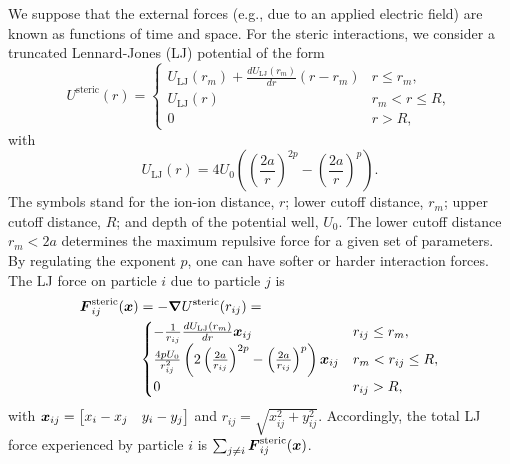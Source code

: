 \documentclass[letterpaper, 11pt]{article}
\begin{document}
We suppose that the external forces (e.g., due to an applied electric field) are known as functions of time and space. For the steric interactions, we consider a truncated Lennard-Jones (LJ) potential of the form
\begin{equation}
  U^{\text{steric}}(r)=
  \begin{cases}
    U_{\text{LJ}}(r_m)+\frac{dU_{\mathrm{LJ}}(r_m)}{dr}(r-r_m) & r\leq r_m,\\
    U_{\text{LJ}}(r) & r_m<r\leq R,\\
    0 & r>R,
  \end{cases}
  \label{Eq:LJPot}
\end{equation}
with
\begin{equation}
  U_{\text{LJ}}(r)=4U_0\left(\left(\frac{2a}{r}\right)^{2p}-\left(\frac{2a}{r}\right)^p\right).
  \label{Eq:LJPot}
\end{equation}
The symbols stand for the ion-ion distance, $r$; lower cutoff distance, $r_m$; upper cutoff distance, $R$; and depth of the potential well, $U_0$. The lower cutoff distance $r_m<2a$ determines the maximum repulsive force for a given set of parameters. By regulating the exponent $p$, one can have softer or harder interaction forces. The LJ force on particle $i$ due to particle $j$ is
\begin{align}
  \boldsymbol{F}^{\text{steric}}_{ij}(\boldsymbol{x})&=-\boldsymbol{\nabla} U^{\text{steric}}(r_{ij})=\nonumber\\
  &\begin{cases}
    -\frac{1}{r_{ij}}\frac{dU_{\mathrm{LJ}}(r_m)}{dr}\boldsymbol{x}_{ij} & r_{ij}\leq r_m,\\
    \frac{4pU_0}{r_{ij}^2}\left(2\left(\frac{2a}{r_{ij}}\right)^{2p}-\left(\frac{2a}{r_{ij}}\right)^p\right)\boldsymbol{x}_{ij} & r_m<r_{ij}\leq R,\\
    0 & r_{ij}>R,
  \end{cases}
  \label{Eq:LJForce}
\end{align}
with $\boldsymbol{x}_{ij}=\begin{bmatrix}x_i-x_j & y_i-y_j\end{bmatrix}$ and $r_{ij}=\sqrt{x_{ij}^2+y_{ij}^2}$. Accordingly, the total LJ force experienced by particle $i$ is $\sum_{j\neq i}\boldsymbol{F}^{\text{steric}}_{ij}(\boldsymbol{x})$.
\end{document}
